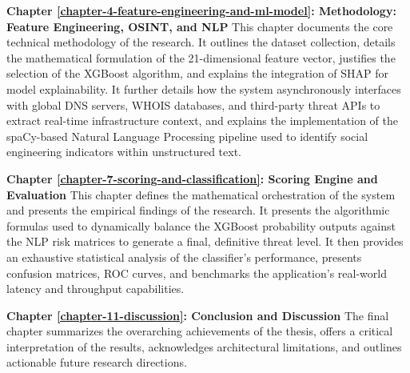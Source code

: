 \textbf{Chapter \ref{chapter-4-feature-engineering-and-ml-model}: Methodology: Feature Engineering, OSINT, and NLP} This chapter documents the core technical methodology of the research. It outlines the dataset collection, details the mathematical formulation of the 21-dimensional feature vector, justifies the selection of the XGBoost algorithm, and explains the integration of SHAP for model explainability. It further details how the system asynchronously interfaces with global DNS servers, WHOIS databases, and third-party threat APIs to extract real-time infrastructure context, and explains the implementation of the spaCy-based Natural Language Processing pipeline used to identify social engineering indicators within unstructured text.

\textbf{Chapter \ref{chapter-7-scoring-and-classification}: Scoring Engine and Evaluation} This chapter defines the mathematical orchestration of the system and presents the empirical findings of the research. It presents the algorithmic formulas used to dynamically balance the XGBoost probability outputs against the NLP risk matrices to generate a final, definitive threat level. It then provides an exhaustive statistical analysis of the classifier's performance, presents confusion matrices, ROC curves, and benchmarks the application's real-world latency and throughput capabilities.

\textbf{Chapter \ref{chapter-11-discussion}: Conclusion and Discussion} The final chapter summarizes the overarching achievements of the thesis, offers a critical interpretation of the results, acknowledges architectural limitations, and outlines actionable future research directions.

